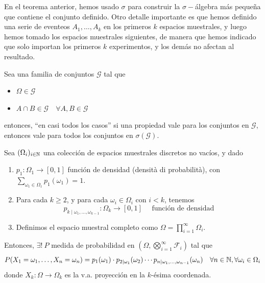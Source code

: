 \begin{observacion}
    En el teorema anterior, hemos usado $\sigma$ para construir la $\sigma-$álgebra más pequeña que contiene el conjunto definido. Otro detalle importante es que hemos definido una serie de eventeos $A_1, \ldots, A_k$ en los primeros $k$ espacios muestrales, y luego hemos tomado los espacios muestrales siguientes, de manera que hemos indicado que solo importan los primeros $k$ experimentos, y los demás no afectan al resultado.
\end{observacion}

\begin{lema}
    Sea una familia de conjuntos $\mathcal{G}$ tal que 
    \begin{itemize}
        \item $\Omega \in \mathcal{G}$
        \item $A\cap B \in \mathcal{G} \quad \forall A, B \in \mathcal{G}$
    \end{itemize}
    entonces, ``en casi todos los casos'' si una propiedad vale para los conjuntos en $\mathcal{G}$, entonces vale para todos los conjuntos en $\sigma(\mathcal{G})$.
\end{lema}

\begin{teo}
    \label{teo:prodotto_infinito} 
    Sea $(\Omega_i)_{i\in \mathbb{N}}$ una colección de espacios muestrales discretos no vacíos, y dado
    \begin{enumerate}
        \item $p_1:\Omega_1 \to [0,1]$ función de densidad (densità di probabilità), con $\sum\limits_{\omega_1 \in \Omega_1} p_1(\omega_1) = 1$.
        \item Para cada $k\geq 2$, y para cada $\omega_i\in \Omega_i$ con $i<k$, tenemos
        \begin{equation*}
            p_{k\mid \omega_1, \ldots, \omega_{k-1}}: \Omega_k \to [0,1] \quad \text{ función de densidad}
        \end{equation*}
        \item Definimos el espacio muestral completo como $\Omega = \prod_{i=1}^{\infty} \Omega_i$.
    \end{enumerate}
    Entonces, $\exists! \ P$ medida de probabilidad en $(\Omega, \bigotimes\limits_{i=1}^{\infty} \mathcal{F}_i)$ tal que
    \begin{equation*}
        P(X_1=\omega_1, \ldots, X_n=\omega_n) = p_1(\omega_1) \cdot p_{2\mid \omega_1}(\omega_2) \cdots p_{n\mid \omega_1, \ldots, \omega_{n-1}}(\omega_n) \quad \forall n\in \mathbb{N}, \forall \omega_i \in \Omega_i
    \end{equation*}
    donde $X_k:\Omega \to \Omega_k$ es la v.a. proyección en la $k$-ésima coordenada.
\end{teo}

